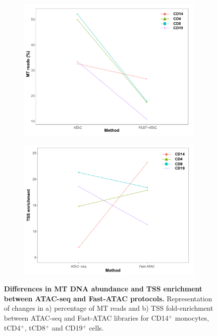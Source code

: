 \begin{figure}[htbp]
\centering
\begin{subfigure}{0.5\textwidth}
\centering
\includegraphics[width=\textwidth]{./Results1/pdfs/ATAC_vs_FAST_ATAC_percnt_MT_reads_dotplot}
\caption{\textbf{}}
\end{subfigure}%
\begin{subfigure}{0.5\textwidth}
\centering
\includegraphics[width=\textwidth]{./Results1/pdfs/ATAC_vs_FAST_ATAC_tss_dotplot}
\caption{\textbf{}}
\end{subfigure}
\caption[Differences in MT DNA abundance and TSS enrichment between ATAC-seq and Fast-ATAC protocols.]{\textbf{Differences in MT DNA abundance and TSS enrichment between ATAC-seq and Fast-ATAC protocols.} Representation of changes in a) percentage of MT reads and b) TSS fold-enrichment between ATAC-seq and Fast-ATAC libraries for CD14$^+$ monocytes, tCD4$^+$, tCD8$^+$ and CD19$^+$ cells.}
\label{figure:ATAC_vs_FAST_ATAC}
\end{figure} 



